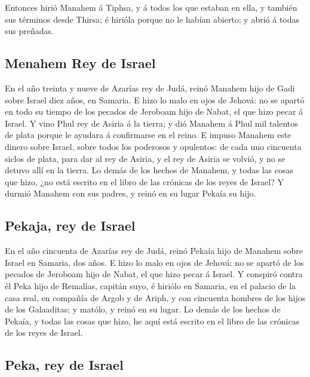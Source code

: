  Entonces hirió Manahem á Tiphsa, y á todos los que estaban
en ella, y también sus términos desde Thirsa; é hirióla porque no le
habían abierto; y abrió á todas sus preñadas.

\hypertarget{menahem-rey-de-israel}{%
\subsection{Menahem Rey de Israel}\label{menahem-rey-de-israel}}

 En el año treinta y nueve de Azarías rey de Judá, reinó
Manahem hijo de Gadi sobre Israel diez años, en Samaria.  E
hizo lo malo en ojos de Jehová: no se apartó en todo su tiempo de los
pecados de Jeroboam hijo de Nabat, el que hizo pecar á Israel.
 Y vino Phul rey de Asiria á la tierra; y dió Manahem á
Phul mil talentos de plata porque le ayudara á confirmarse en el reino.
 E impuso Manahem este dinero sobre Israel, sobre todos los
poderosos y opulentos: de cada uno cincuenta siclos de plata, para dar
al rey de Asiria, y el rey de Asiria se volvió, y no se detuvo allí en
la tierra.  Lo demás de los hechos de Manahem, y todas las
cosas que hizo, ¿no está escrito en el libro de las crónicas de los
reyes de Israel?  Y durmió Manahem con sus padres, y reinó
en su lugar Pekaía su hijo.

\hypertarget{pekaja-rey-de-israel}{%
\subsection{Pekaja, rey de Israel}\label{pekaja-rey-de-israel}}

 En el año cincuenta de Azarías rey de Judá, reinó Pekaía
hijo de Manahem sobre Israel en Samaria, dos años.  E hizo
lo malo en ojos de Jehová: no se apartó de los pecados de Jeroboam hijo
de Nabat, el que hizo pecar á Israel.  Y conspiró contra él
Peka hijo de Remalías, capitán suyo, é hiriólo en Samaria, en el palacio
de la casa real, en compañía de Argob y de Ariph, y con cincuenta
hombres de los hijos de los Galaaditas; y matólo, y reinó en su lugar.
 Lo demás de los hechos de Pekaía, y todas las cosas que
hizo, he aquí está escrito en el libro de las crónicas de los reyes de
Israel.

\hypertarget{peka-rey-de-israel}{%
\subsection{Peka, rey de Israel}\label{peka-rey-de-israel}}


